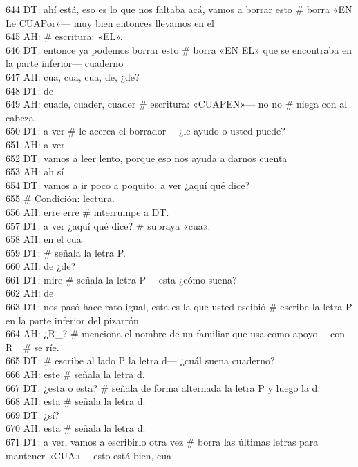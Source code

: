 644 DT: ahí está, eso es lo que nos faltaba acá, vamos a borrar esto \# borra «EN Le CUAPor»--- muy bien entonces llevamos en el\\
645 AH: \# escritura: «EL».\\
646 DT: entonce ya podemos borrar esto \# borra «EN EL» que se encontraba en la parte inferior--- cuaderno\\
647 AH: cua, cua, cua, de, ¿de?\\
648 DT: de\\
649 AH: cuade, cuader, cuader \# escritura: «CUAPEN»--- no no \# niega con al cabeza.\\
650 DT: a ver \# le acerca el borrador--- ¿le ayudo o usted puede?\\
651 AH: a ver\\
652 DT: vamos a leer lento, porque eso nos ayuda a darnos cuenta\\
653 AH: ah sí\\
654 DT: vamos a ir poco a poquito, a ver ¿aquí qué dice?\\
655 \# Condición: lectura.\\
656 AH: erre erre \# interrumpe a DT.\\
657 DT: a ver ¿aquí qué dice? \# subraya «cua».\\
658 AH: en el cua\\
659 DT: \# señala la letra P.\\
660 AH: de ¿de?\\
661 DT: mire \# señala la letra P--- esta ¿cómo suena?\\
662 AH: de\\
663 DT: nos pasó hace rato igual, esta es la que usted escibió \# escribe la letra P en la parte inferior del pizarrón.\\
664 AH: ¿R\_? \# menciona el nombre de un familiar que usa como apoyo--- con R\_ \# se ríe.\\
665 DT: \# escribe al lado P la letra d--- ¿cuál suena cuaderno?\\
666 AH: este \# señala la letra d.\\
667 DT: ¿esta o esta? \# señala de forma alternada la letra P y luego la d.\\
668 AH: esta \# señala la letra d.\\
669 DT: ¿sí?\\
670 AH: esta \# señala la letra d.\\
671 DT: a ver, vamos a escribirlo otra vez \# borra las últimas letras para mantener «CUA»--- esto está bien, cua\\
